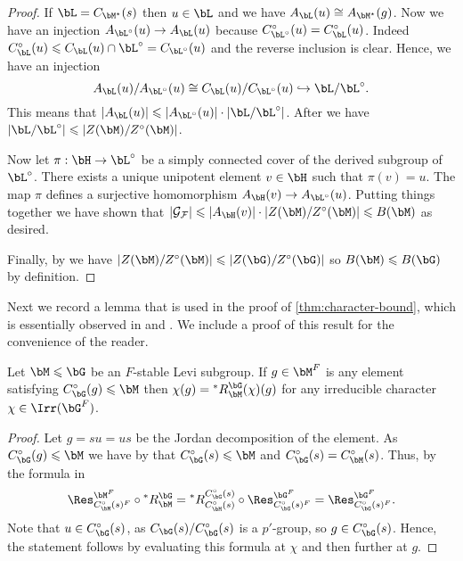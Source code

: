 \documentclass[eqthmnum,nocolour,skinny]{jt-calcs}
\begin{document}
\begin{proof}
If $\bL = C_{\bM^{\star}}(s)$ then $u \in \bL$ and we have $A_{\bL}(u) \cong A_{\bM^{\star}}(g)$. Now we have an injection $A_{\bL^{\circ}}(u) \to A_{\bL}(u)$ because $C_{\bL^{\circ}}^{\circ}(u) = C_{\bL}^{\circ}(u)$. Indeed $C_{\bL}^{\circ}(u) \leqslant C_{\bL}(u) \cap \bL^{\circ} = C_{\bL^{\circ}}(u)$ and the reverse inclusion is clear. Hence, we have an injection
\begin{equation*}
A_{\bL}(u)/A_{\bL^{\circ}}(u) \cong C_{\bL}(u)/C_{\bL^{\circ}}(u) \hookrightarrow \bL/\bL^{\circ}.
\end{equation*}
This means that $|A_{\bL}(u)| \leqslant |A_{\bL^{\circ}}(u)|\cdot |\bL/\bL^{\circ}|$. After \cite[13.14(iii)]{digne-michel:1991:representations-of-finite-groups-of-lie-type} we have $|\bL/\bL^{\circ}| \leqslant |Z(\bM)/Z^{\circ}(\bM)|$.

Now let $\pi : \bH \to \bL^{\circ}$ be a simply connected cover of the derived subgroup of $\bL^{\circ}$. There exists a unique unipotent element $v \in \bH$ such that $\pi(v) = u$. The map $\pi$ defines a surjective homomorphism $A_{\bH}(v) \to A_{\bL^{\circ}}(u)$. Putting things together we have shown that $|\mathcal{G_F}| \leqslant |A_{\bH}(v)|\cdot |Z(\bM)/Z^{\circ}(\bM)| \leqslant B(\bM)$ as desired.

Finally, by \cite[4.2]{bonnafe:2006:sln} we have $|Z(\bM)/Z^{\circ}(\bM)| \leqslant |Z(\bG)/Z^{\circ}(\bG)|$ so $B(\bM) \leqslant B(\bG)$ by definition.
\end{proof}

Next we record a lemma that is used in the proof of \cref{thm:character-bound}, which is essentially observed in \cite[12.22]{digne-michel:1991:representations-of-finite-groups-of-lie-type} and \cite[\S25.A]{bonnafe:2006:sln}. We include a proof of this result for the convenience of the reader.

\begin{lem}\label{lem:restrict-equal-val}
Let $\bM \leqslant \bG$ be an $F$-stable Levi subgroup. If $g \in \bM^F$ is any element satisfying $C_{\bG}^{\circ}(g) \leqslant \bM$ then $\chi(g) = {}^*R_{\bM}^{\bG}(\chi)(g)$ for any irreducible character $\chi \in \Irr(\bG^F)$.
\end{lem}

\begin{proof}
Let $g = su = us$ be the Jordan decomposition of the element. As $C_{\bG}^{\circ}(g) \leqslant \bM$ we have by \cite[1.3]{bonnafe:2004:actions-of-rel-Weyl-grps-I} that $C_{\bG}^{\circ}(s) \leqslant \bM$ and $C_{\bG}^{\circ}(s) = C_{\bM}^{\circ}(s)$. Thus, by the formula in \cite[12.5]{digne-michel:1991:representations-of-finite-groups-of-lie-type}
\begin{equation*}
\Res_{C_{\bM}^{\circ}(s)^F}^{\bM^F}\circ {}^*R_{\bM}^{\bG}
= {}^*R_{C_\bM^\circ(s)}^{C_\bG^\circ(s)} \circ \Res_{C_{\bG}^{\circ}(s)^F}^{\bG^F} = \Res_{C_{\bG}^{\circ}(s)^F}^{\bG^F}.
\end{equation*}
Note that $u \in C_{\bG}^{\circ}(s)$, as $C_{\bG}(s)/C_{\bG}^{\circ}(s)$ is a $p'$-group, so $g \in C_{\bG}^{\circ}(s)$. Hence, the statement follows by evaluating this formula at $\chi$ and then further at $g$.
\end{proof}
\end{document}
